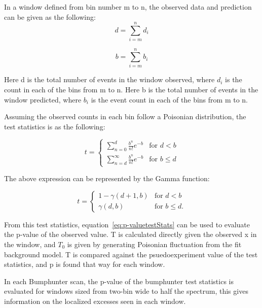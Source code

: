 In a window defined from bin number m to n, the observed data and prediction can be given as the following: 
    \begin{equation}
         d= \sum_{i=m}^{n} d_i 
    \end{equation}

    
    \begin{equation}
         b= \sum_{i=m}^{n} b_i
    \end{equation}

    Here d is the total number of events in the window observed, where $d_i$ is the count in each of the bins from m to n. 
    Here b is the total number of events in the window predicted, where $b_i$ is the event count in each of the bins from m to n.
    
    Assuming the observed counts in each bin follow a Poisonian distribution, the test statistics is as the following:

	\begin{equation}
    t=
    \begin{cases} \sum_{n=0}^{d} \frac{b^{n}}{n!} e^{-b} &  \textrm{for $d < b$}
    \\
    \sum_{n=d}^{\infty} \frac{b^n}{n!} e^{-b} &  \textrm{for $b \leq d$}
    \end{cases}
    \end{equation}

    The above expression can be represented by the Gamma function: 

	\begin{equation}
    t=
    \begin{cases} 1-\gamma(d+1, b) &  \textrm{for $d < b$}
    \\
    \gamma(d,b) &  \textrm{for $b \leq d$}.
    \end{cases}
    \end{equation}
    


    From this test statistics, equation~\ref{eq:p-valuetestStats} can be used to evaluate the p-value of the observed value. T is calculated directly given the observed x in the window, and $T_{0}$ is given by generating Poisonian fluctuation from the fit background model. T is compared against the psuedoexperiment value of the test statistics, and p is found that way for each window. 

    In each Bumphunter scan, the p-value of the bumphunter test statistics is evaluated for windows sized from two-bin wide to half the spectrum, this gives information on the localized excesses seen in each window.


